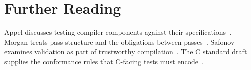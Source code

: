 \section{Further Reading}\label{sec:ch37-reading}

Appel discusses testing compiler components against their specifications~\cite{appel-1998-modern}.
Morgan treats pass structure and the obligations between passes~\cite{morgan-1998-optimizing}.
Safonov examines validation as part of trustworthy compilation~\cite{safonov-2010-trustworthy}.
The C standard draft supplies the conformance rules that C-facing tests must encode~\cite{wg14-2011-c11}.
